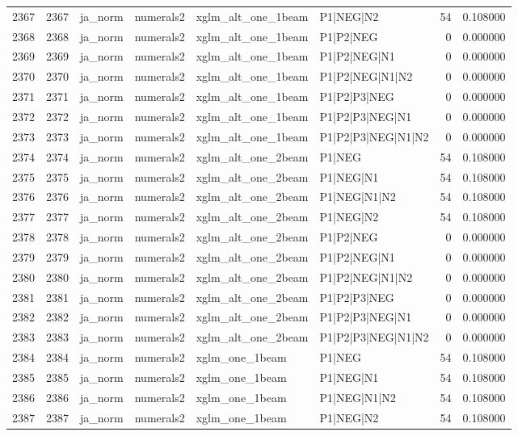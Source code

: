 \begin{tabular}{lrllllrr}
2367 & 2367 & ja_norm & numerals2 & xglm_alt_one_1beam & P1|NEG|N2 & 54 & 0.108000 \\
2368 & 2368 & ja_norm & numerals2 & xglm_alt_one_1beam & P1|P2|NEG & 0 & 0.000000 \\
2369 & 2369 & ja_norm & numerals2 & xglm_alt_one_1beam & P1|P2|NEG|N1 & 0 & 0.000000 \\
2370 & 2370 & ja_norm & numerals2 & xglm_alt_one_1beam & P1|P2|NEG|N1|N2 & 0 & 0.000000 \\
2371 & 2371 & ja_norm & numerals2 & xglm_alt_one_1beam & P1|P2|P3|NEG & 0 & 0.000000 \\
2372 & 2372 & ja_norm & numerals2 & xglm_alt_one_1beam & P1|P2|P3|NEG|N1 & 0 & 0.000000 \\
2373 & 2373 & ja_norm & numerals2 & xglm_alt_one_1beam & P1|P2|P3|NEG|N1|N2 & 0 & 0.000000 \\
2374 & 2374 & ja_norm & numerals2 & xglm_alt_one_2beam & P1|NEG & 54 & 0.108000 \\
2375 & 2375 & ja_norm & numerals2 & xglm_alt_one_2beam & P1|NEG|N1 & 54 & 0.108000 \\
2376 & 2376 & ja_norm & numerals2 & xglm_alt_one_2beam & P1|NEG|N1|N2 & 54 & 0.108000 \\
2377 & 2377 & ja_norm & numerals2 & xglm_alt_one_2beam & P1|NEG|N2 & 54 & 0.108000 \\
2378 & 2378 & ja_norm & numerals2 & xglm_alt_one_2beam & P1|P2|NEG & 0 & 0.000000 \\
2379 & 2379 & ja_norm & numerals2 & xglm_alt_one_2beam & P1|P2|NEG|N1 & 0 & 0.000000 \\
2380 & 2380 & ja_norm & numerals2 & xglm_alt_one_2beam & P1|P2|NEG|N1|N2 & 0 & 0.000000 \\
2381 & 2381 & ja_norm & numerals2 & xglm_alt_one_2beam & P1|P2|P3|NEG & 0 & 0.000000 \\
2382 & 2382 & ja_norm & numerals2 & xglm_alt_one_2beam & P1|P2|P3|NEG|N1 & 0 & 0.000000 \\
2383 & 2383 & ja_norm & numerals2 & xglm_alt_one_2beam & P1|P2|P3|NEG|N1|N2 & 0 & 0.000000 \\
2384 & 2384 & ja_norm & numerals2 & xglm_one_1beam & P1|NEG & 54 & 0.108000 \\
2385 & 2385 & ja_norm & numerals2 & xglm_one_1beam & P1|NEG|N1 & 54 & 0.108000 \\
2386 & 2386 & ja_norm & numerals2 & xglm_one_1beam & P1|NEG|N1|N2 & 54 & 0.108000 \\
2387 & 2387 & ja_norm & numerals2 & xglm_one_1beam & P1|NEG|N2 & 54 & 0.108000 \\

\end{tabular}
